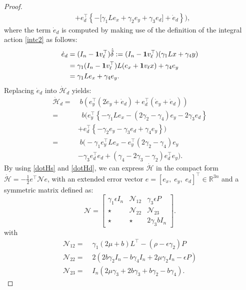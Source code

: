 \documentclass[journal,twoside]{IEEEtran}
\def\rea{\mathbb{R}}
\def\rea{\mathbb{R}}
\begin{document}
\begin{proof}
\begin{align}
 &+ e_d^\top \left\{- \Big [ \gamma_1 L e_x +\gamma_2e_y +\gamma_3 e_d\Big] +\dot e_d \right\}\Big), \nonumber 
\end{align} 
where the term $\dot e_d$ is computed by making use of the definition of the integral action \eqref{intc2} as follows:
\begin{align}
\dot e_d=&\; (I_n-{\bf 1} v_\ell^\top) \dot{\tilde \delta}:=  (I_n-{\bf 1} v_\ell^\top)  ( \gamma_1 L x +\gamma_4 y) \nonumber \\
=&\;  \gamma_1  (I_n-{\bf 1} v_\ell^\top) L (e_x +{\bf 1} v_\ell x)+\gamma_4 e_y \nonumber \\
=&\; \gamma_1 L e_x +\gamma_4 e_y.
\end{align}
Replacing $\dot e_d$ into $\dot {\mathcal H}_d$ yields: 
\begin{align}
\dot {\mathcal H}_d =& \;b\left(e_y^\top (2 \dot e_y +\dot e_d)+ e_d^\top (\dot e_y +\dot e_d)\right) \nonumber \\
 =&\;  \;b\Big(e_y^\top \left\{- \gamma_1 L e_x -(2  \gamma_2-\gamma_4) e_y -2 \gamma_3 e_d \right\} \nonumber \\
 &+ e_d^\top \left\{- \gamma_2e_y - \gamma_3 e_d + \gamma_4 e_y \right\}\Big) \nonumber \\
 =&\; b\Big(- \gamma_1 e_y^\top  L e_x - e_y^\top (2  \gamma_2-\gamma_4) e_y \nonumber \\
 & -\gamma_3 e_d^\top e_d   + (\gamma_4 -2 \gamma_3  - \gamma_2 ) e_d^\top   e_y \Big).
 \label{dotHd}
\end{align} 
By using \eqref{dotHs} and \eqref{dotHd}, we can express $\dot{\mathcal H}$ in the compact form $\dot {\mathcal H}=-\frac{1}{2}e^\top {\mathcal N} e$, with an extended error vector $e=[e_x, \; e_y, \; e_d]^\top \in \rea^{3n}$ and a symmetric matrix defined as:
\begin{equation}
{\mathcal N}=  \left[ \begin{array}{ccc} \gamma_1 \epsilon I_n &    {\mathcal N}_{12}  & \gamma_3 \epsilon P \\ \star   & {\mathcal N}_{22}  & {\mathcal N}_{23}\\
\star &   \star & 2 \gamma_3 b I_n
\end{array} \right]. 
\end{equation}
with
\begin{align}
{\mathcal N}_{12}=&\; \gamma_1 (2 \mu +b) L^\top -(\rho -\epsilon \gamma_2) P   \nonumber \\
{\mathcal N}_{22}=& \;2 (2b  \gamma_2I_n- b \gamma_4 I_n+ 2 \mu  \gamma_2 I_n - \epsilon P) \nonumber \\
{\mathcal N}_{23}=&\;  I_n( 2\mu \gamma_3  +2b \gamma_3 +b \gamma_2-b\gamma_4).
\end{align}


\end{proof}
\end{document}
